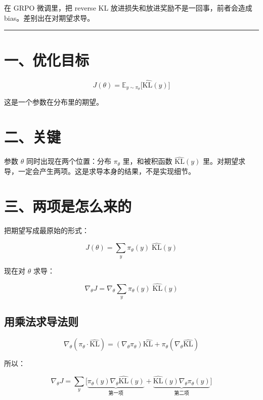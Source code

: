 在 GRPO 微调里，把 reverse KL 放进损失和放进奖励不是一回事，前者会造成 bias。差别出在对期望求导。

\hrule

\section{一、优化目标}

\[
J(\theta) = \mathbb{E}_{y\sim\pi_\theta} \big[ \widehat{\mathrm{KL}}(y) \big]
\]

这是一个\colorbox{mdc1}{\textcolor{mdc2}{参数在分布里}}的期望。

\section{二、关键}

参数 \(\theta\) 同时出现在两个位置：分布 \(\pi_\theta\) 里，和被积函数 \(\widehat{\mathrm{KL}}(y)\) 里。对期望求导，一定会产生两项。这是求导本身的结果，不是实现细节。

\section{三、两项是怎么来的}

把期望写成最原始的形式：

\[
J(\theta) = \sum_y \pi_\theta(y)\; \widehat{\mathrm{KL}}(y)
\]

现在对 \(\theta\) 求导：

\[
\nabla_\theta J = \nabla_\theta \sum_y \pi_\theta(y)\; \widehat{\mathrm{KL}}(y)
\]

\subsection{用乘法求导法则}

\[
\nabla_\theta(\pi_\theta \cdot \widehat{\mathrm{KL}}) = (\nabla_\theta \pi_\theta)\widehat{\mathrm{KL}} + \pi_\theta (\nabla_\theta \widehat{\mathrm{KL}})
\]

所以：

\[
\nabla_\theta J = \sum_y \Big[ \underbrace{\pi_\theta(y)\nabla_\theta \widehat{\mathrm{KL}}(y)}_{\text{第一项}} + \underbrace{\widehat{\mathrm{KL}}(y)\nabla_\theta \pi_\theta(y)}_{\text{第二项}} \Big]
\]

